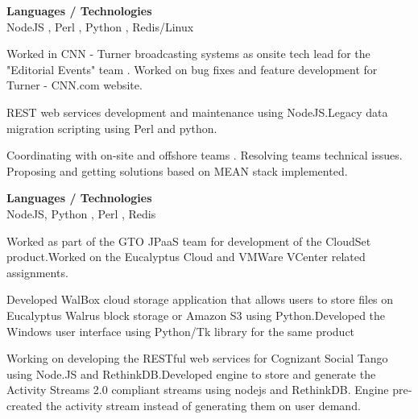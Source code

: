 \documentclass[a4,10pt]{cv4tw}
\begin{document}
                                        {\textbf{Languages / Technologies} \\ NodeJS , Perl , Python , Redis/Linux}
                                        {
                                            \begin{missions}
                                            \item Worked in CNN - Turner broadcasting systems as onsite tech lead for the "Editorial Events" team . Worked on bug fixes and feature development for Turner - CNN.com website.
                                            \item REST web services development and maintenance using NodeJS.Legacy data migration scripting using Perl and python.
                                            \item Coordinating with on-site and offshore teams . Resolving teams technical issues. Proposing and getting solutions based on MEAN stack implemented.
                                            \end{missions}
                                            }

                                            {\textbf{Languages / Technologies} \\ NodeJS, Python , Perl , Redis}
                                            {
                                                \begin{missions}
                                                \item Worked as part of the GTO JPaaS team for development of the CloudSet product.Worked on the Eucalyptus Cloud and VMWare VCenter related assignments.
                                                \item Developed WalBox cloud storage application that allows users to store files on Eucalyptus Walrus block storage or Amazon S3 using Python.Developed the Windows user interface using Python/Tk library for the same product
                                                \item Working on  developing the RESTful web services for Cognizant Social Tango using Node.JS and RethinkDB.Developed engine to store and generate the Activity Streams 2.0 compliant streams using nodejs and RethinkDB. Engine pre-created the activity stream instead of generating them on user demand.
                                                \end{missions}
                                                }
\end{document}
